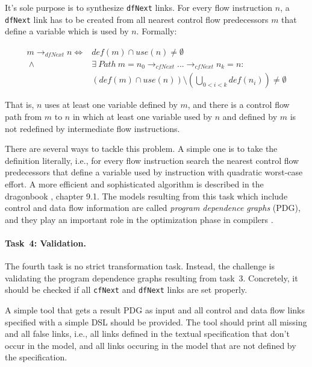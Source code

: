 \documentclass[submission]{eptcs}
\begin{document}
It's sole purpose is to synthesize \verb|dfNext| links.  For every flow
instruction $n$, a \verb|dfNext| link has to be created from all nearest
control flow predecessors $m$ that define a variable which is used by $n$.
Formally:

\begin{align*}
  m \rightarrow_{dfNext} n  \iff {} & def(m) \cap use(n) \neq \emptyset\\
  ~\land {} & \exists~Path~m = n_0 \rightarrow_{cfNext} ... \rightarrow_{cfNext} n_k = n:\\
  & \left(def(m) \cap use(n)\right) \setminus \left(\bigcup_{0 < i < k}
    def(n_i)\right) \neq \emptyset
\end{align*}

That is, $n$ uses at least one variable defined by $m$, and there is a control
flow path from $m$ to $n$ in which at least one variable used by $n$ and
defined by $m$ is not redefined by intermediate flow instructions.

There are several ways to tackle this problem.  A simple one is to take the
definition literally, i.e., for every flow instruction search the nearest
control flow predecessors that define a variable used by instruction with
quadratic worst-case effort.  A more efficient and sophisticated algorithm is
described in the dragonbook \cite{Aho:CPTT}, chapter 9.1.  The models resulting
from this task which include control and data flow information are called
\emph{program dependence graphs} (PDG), and they play an important role in the
optimization phase in compilers \cite{Ferrante:1987:PDG:24039.24041}.


\paragraph{Task~4: Validation.}
\label{sec:task4-validation}

The fourth task is no strict transformation task.  Instead, the challenge is
validating the program dependence graphs resulting from task~3.  Concretely, it
should be checked if all \verb|cfNext| and \verb|dfNext| links are set
properly.

A simple tool that gets a result PDG as input and all control and data flow
links specified with a simple DSL should be provided.  The tool should print
all missing and all false links, i.e., all links defined in the textual
specification that don't occur in the model, and all links occuring in the
model that are not defined by the specification.
\end{document}
